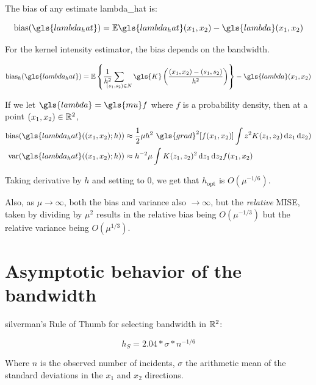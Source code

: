 The bias of any estimate \gls{lambda_hat} is:

\begin{equation}
    \mbox{bias}(\gls{lambda_hat}) = \E \gls{lambda_hat}\xvec - \gls{lambda}\xvec%
\end{equation}

For the \gls{kernel intensity estimator}, the bias depends on the bandwidth.

\begin{equation}
    \mbox{bias}_h(\gls{lambda_hat}) = \E \left\{%
            \sumS{\gls{K}\left(\frac{\xvec-(s_1, s_2)}{h^2}\right)}%
        \right\}%
        - \gls{lambda}\xvec%
\end{equation}

If we let $\gls{lambda} = \gls{mu} f$ where $f$ is a probability density, then at a point $(x_1, x_2) \in \mathbb{R}^2$,
\begin{align}
    \mbox{bias}(\gls{lambda_hat}(\xvec;h)) & \approx
        \frac{1}{2} \mu h^2 ~ \gls{grad}^2\!\left[ f\xvec \right]
            \int { z^2 K(z_1, z_2) \diff{z_1} \diff{z_2)} } \\
    \mbox{var}(\gls{lambda_hat}(\xvec;h)) & \approx
        h^{-2} \mu
            \int { K(z_1, z_2)^2\diff{z_1} \diff{z_2} } f\xvec
\end{align}

Taking derivative by $h$ and setting to $0$, we get that $h_{\mbox{opt}}$ is $O(\mu^{-1/6})$.

Also, as $\mu \to \infty$, both the bias and variance also $\to \infty$,
but the \textit{relative} MISE, taken by dividing by $\mu^2$ results in the relative bias being $O(\mu^{-1/3})$
but the relative variance being $O(\mu^{1/3})$.

\section{Asymptotic behavior of the bandwidth}
\label{sec:theory:asymptotic_bandwidth}

\Gls{silverman}'s Rule of Thumb for selecting bandwidth in $\mathbb{R}^2$:

\begin{equation}
\label{eq:silverman}
    h_S = 2.04 * \sigma * n^{-1/6}
\end{equation}

Where $n$ is the observed number of incidents,
$\sigma$ the arithmetic mean of the standard deviations in the $x_1$ and $x_2$ directions.



